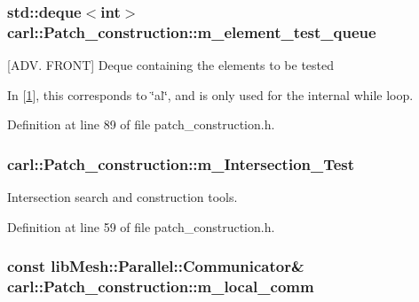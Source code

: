 \subsubsection[{m\+\_\+element\+\_\+test\+\_\+queue}]{\setlength{\rightskip}{0pt plus 5cm}std\+::deque$<$int$>$ carl\+::\+Patch\+\_\+construction\+::m\+\_\+element\+\_\+test\+\_\+queue\hspace{0.3cm}{\ttfamily [protected]}}\label{classcarl_1_1_patch__construction_a4afa35f6be957a083ac586ae158b55dc}


\mbox{[}A\+D\+V. F\+R\+O\+N\+T\mbox{]} Deque containing the elements to be tested 

In \mbox{[}\hyperlink{classcarl_1_1_patch__construction_Gander_article}{1}\mbox{]}, this corresponds to \char`\"{}al\char`\"{}, and is only used for the internal \textquotesingle{}while\textquotesingle{} loop. 

Definition at line 89 of file patch\+\_\+construction.\+h.

\hypertarget{classcarl_1_1_patch__construction_a59f947d3d18761b1ad1a5913eb59ca83}{}
\subsubsection[{m\+\_\+\+Intersection\+\_\+\+Test}]{ carl\+::\+Patch\+\_\+construction\+::m\+\_\+\+Intersection\+\_\+\+Test\hspace{0.3cm}{\ttfamily [protected]}}\label{classcarl_1_1_patch__construction_a59f947d3d18761b1ad1a5913eb59ca83}


Intersection search and construction tools. 



Definition at line 59 of file patch\+\_\+construction.\+h.

\hypertarget{classcarl_1_1_patch__construction_a4fb3ddf7050cb02a6b0451536048f5d3}{}
\subsubsection[{m\+\_\+local\+\_\+comm}]{\setlength{\rightskip}{0pt plus 5cm}const lib\+Mesh\+::\+Parallel\+::\+Communicator\& carl\+::\+Patch\+\_\+construction\+::m\+\_\+local\+\_\+comm\hspace{0.3cm}{\ttfamily [protected]}}\label{classcarl_1_1_patch__construction_a4fb3ddf7050cb02a6b0451536048f5d3}


